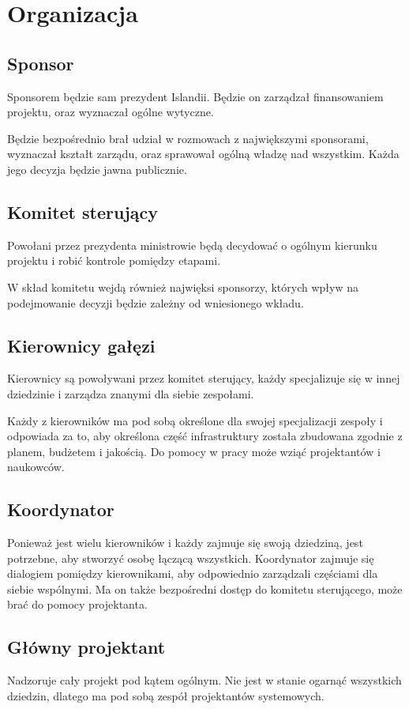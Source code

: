 \section{Organizacja} 
\subsection{Sponsor}
Sponsorem będzie sam prezydent Islandii.
Będzie on zarządzał finansowaniem projektu, oraz wyznaczał ogólne wytyczne.

Będzie bezpośrednio brał udział w rozmowach z największymi sponsorami, wyznaczał kształt zarządu, oraz sprawował ogólną władzę nad wszystkim.
Każda jego decyzja będzie jawna publicznie.

\subsection{Komitet sterujący}
Powołani przez prezydenta ministrowie będą decydować o ogólnym kierunku projektu i robić kontrole pomiędzy etapami.

W skład komitetu wejdą również najwięksi sponsorzy, których wpływ na podejmowanie decyzji będzie zależny od wniesionego wkładu.

\subsection{Kierownicy gałęzi}
Kierownicy są powoływani przez komitet sterujący, każdy specjalizuje się w innej dziedzinie i zarządza znanymi dla siebie zespołami.

Każdy z kierowników ma pod sobą określone dla swojej specjalizacji zespoły i odpowiada za to, aby określona część infrastruktury została zbudowana zgodnie z planem, budżetem i jakością.
Do pomocy w pracy może wziąć projektantów i naukowców.

\subsection{Koordynator}
Ponieważ jest wielu kierowników i każdy zajmuje się swoją dziedziną, jest potrzebne, aby stworzyć osobę łączącą wszystkich.
Koordynator zajmuje się dialogiem pomiędzy kierownikami, aby odpowiednio zarządzali częściami dla siebie wspólnymi.
Ma on także bezpośredni dostęp do komitetu sterującego, może brać do pomocy projektanta.

\subsection{Główny projektant}
Nadzoruje cały projekt pod kątem ogólnym. 
Nie jest w stanie ogarnąć wszystkich dziedzin, dlatego ma pod sobą zespół projektantów systemowych.

